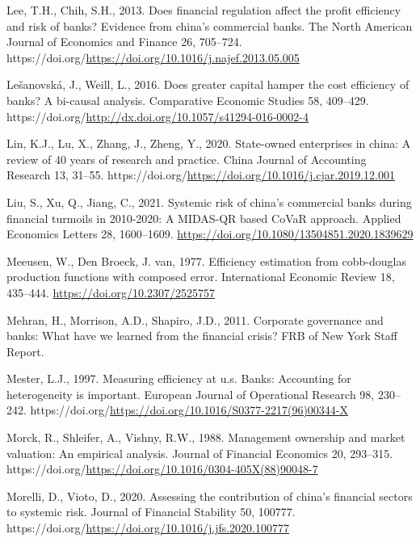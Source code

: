\documentclass[
  12pt,
  a4paper,
]{scrreprt}
\newlength{\cslhangindent}
\newenvironment{CSLReferences}[2] %
 {\begin{list}{}{%
  \setlength{\itemindent}{0pt}
  \setlength{\leftmargin}{0pt}
  \setlength{\parsep}{0pt}
  \ifodd #1
   \setlength{\leftmargin}{\cslhangindent}
   \setlength{\itemindent}{-1\cslhangindent}
  \fi
  \setlength{\itemsep}{#2\baselineskip}}}
 {\end{list}}
\begin{document}
{{{{\begin{CSLReferences}{1}{0}
Lee, T.H., Chih, S.H., 2013. Does financial regulation affect the profit
efficiency and risk of banks? Evidence from china's commercial banks.
The North American Journal of Economics and Finance 26, 705--724.
https://doi.org/\url{https://doi.org/10.1016/j.najef.2013.05.005}

Lešanovská, J., Weill, L., 2016. Does greater capital hamper the cost
efficiency of banks? A bi-causal analysis. Comparative Economic Studies
58, 409--429.
https://doi.org/\url{http://dx.doi.org/10.1057/s41294-016-0002-4}

Lin, K.J., Lu, X., Zhang, J., Zheng, Y., 2020. State-owned enterprises
in china: A review of 40 years of research and practice. China Journal
of Accounting Research 13, 31--55.
https://doi.org/\url{https://doi.org/10.1016/j.cjar.2019.12.001}

Liu, S., Xu, Q., Jiang, C., 2021. Systemic risk of china's commercial
banks during financial turmoils in 2010-2020: A MIDAS-QR based CoVaR
approach. Applied Economics Letters 28, 1600--1609.
\url{https://doi.org/10.1080/13504851.2020.1839629}

Meeusen, W., Den Broeck, J. van, 1977. Efficiency estimation from
cobb-douglas production functions with composed error. International
Economic Review 18, 435--444. \url{https://doi.org/10.2307/2525757}

Mehran, H., Morrison, A.D., Shapiro, J.D., 2011. Corporate governance
and banks: What have we learned from the financial crisis? FRB of New
York Staff Report.

Mester, L.J., 1997. Measuring efficiency at u.s. Banks: Accounting for
heterogeneity is important. European Journal of Operational Research 98,
230--242.
https://doi.org/\url{https://doi.org/10.1016/S0377-2217(96)00344-X}

Morck, R., Shleifer, A., Vishny, R.W., 1988. Management ownership and
market valuation: An empirical analysis. Journal of Financial Economics
20, 293--315.
https://doi.org/\url{https://doi.org/10.1016/0304-405X(88)90048-7}

Morelli, D., Vioto, D., 2020. Assessing the contribution of china's
financial sectors to systemic risk. Journal of Financial Stability 50,
100777. https://doi.org/\url{https://doi.org/10.1016/j.jfs.2020.100777}


\end{CSLReferences}}}}}
\end{document}

